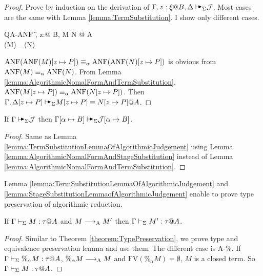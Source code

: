 \begin{proof}
    Prove by induction on the derivation of \( \G, z:\xi@B, \D \AVS \mathcal{J}
    \). Most cases are the same with Lemma \ref{lemma:TermSubstitution}. I show
    only different cases.

    \begin{rneqncase}{\textsc{QA-ANF}}{
            \G, z:\xi @ B, \D \AVS M \E N @ A \\
            \ANF(M) \E_\alpha \ANF(N)
        }
    \end{rneqncase}
    \( \text{ANF}(\text{ANF}(M)[z \mapsto P]) \equiv_\alpha \text{ANF}(\text{ANF}(N)[z \mapsto P]) \) is obvious from \( \text{ANF}(M) \equiv_\alpha \text{ANF}(N) \).
    From Lemma \ref{lemma:AlgorithmicNomalFormAndTermSubstitution}, \( \text{ANF}(M[z \mapsto P]) \equiv_\alpha \text{ANF}(N[z \mapsto P]) \).
    Then \( \G, \D[z \mapsto P] \AVS M[z \mapsto P] \E N[z \mapsto P] @ A \).
\end{proof}

\begin{lemma}
    \label{lemma:StageSubstitutionLemmaofAlgorithmicJudgement}
    If $\G \AVS \mathcal{J}$ then $\G[\alpha \mapsto B] \AVS \mathcal{J}[\alpha \mapsto B]$.
\end{lemma}

\begin{proof}
    Same as Lemma \ref{lemma:TermSubstitutionLemmaOfAlgorithmicJudgement} using
    Lemma \ref{lemma:AlgorithmicNomalFormAndStageSubstitution} instead of Lemma
    \ref{lemma:AlgorithmicNomalFormAndTermSubstitution}.
\end{proof}

Lemma \ref{lemma:TermSubstitutionLemmaOfAlgorithmicJudgement} and
\ref{lemma:StageSubstitutionLemmaofAlgorithmicJudgement} enable to prove type
preservation of algorithmic reduction.

\begin{lemma}
    \label{lemma:TypePreservationofAlgorithmicReduction}
    If \( \Gamma \vdash_\Sigma M:\tau @A \) and \( M \longrightarrow_{\text{A}} M' \) then \( \Gamma \vdash_\Sigma M' : \tau @ A \).
\end{lemma}

\begin{proof}
    Similar to Theorem \ref{theorem:TypePreservation}, we prove type and
    equivalence preservation lemma and use them. The different case is
    \textsc{A-\%}.  If \( \Gamma \vdash_\Sigma \%_\alpha M : \tau @ A \), \( \%_\alpha M \longrightarrow_{\text{A}} M
    \) and \( \text{FV}(\%_\alpha M) = \emptyset \), \( M \) is a closed term.
    So \( \Gamma \vdash_\Sigma M : \tau @ A \).
\end{proof}


